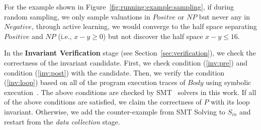 For the example shown in Figure~\ref{fig:running:example:sampling}, if during random sampling, we only sample valuations in $Positve$ or $NP$ but never any in $Negative$, through active learning, we would converge to the half space separating $Positive$ and $NP$ (i.e., $x-y \geq 0$) but not discover the half space $x - y \leq 16$.




    In the \textbf{Invariant Verification} stage (see Section~\ref{sec:verification}),
    we check the correctness of the invariant candidate.
    First, we check condition (\ref{inv:pre}) and condition (\ref{inv:post}) with the candidate.
    Then, we verify the condition (\ref{inv:loop})
    based on all of the program execution traces of $\mathit{Body}$ using symbolic execution~\cite{}.
    The above conditions are checked by SMT~\cite{barrett2009satisfiability} solvers in this work.
    If all of the above conditions are satisfied,
    we claim the correctness of $P$ with its loop invariant.
    Otherwise, we add the counter-example from SMT Solving to $S_{\mathit{in}}$
    and restart from the \emph{data collection} stage.

